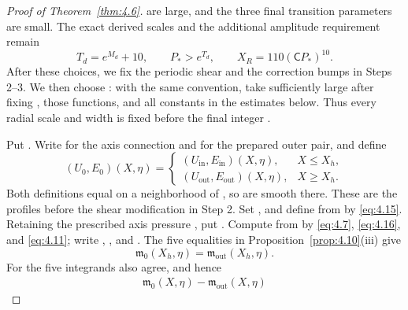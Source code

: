 \begin{proof}[Proof of Theorem~\ref{thm:4.6}]
 are large, and the three final transition
parameters are small. The exact derived scales and the additional amplitude requirement remain
\[
T_d=e^{M_d}+10,\qquad P_*>e^{T_d},\qquad X_R=110(\mathsf C P_*)^{10}.
\]
After these choices, we fix the periodic shear and the correction bumps in Steps 2--3. We then
choose : with the same convention, take
 sufficiently large after fixing
, those functions, and all constants in the estimates
below. Thus every radial scale and width is fixed before the final integer
.

Put . Write
 for the axis connection and
 for the prepared outer pair, and define
\[
(U_0,E_0)(X,\eta)=
\begin{cases}
(U_{\mathrm{in}},E_{\mathrm{in}})(X,\eta),&X\le X_h,\\
(U_{\mathrm{out}},E_{\mathrm{out}})(X,\eta),&X\ge X_h.
\end{cases}
\]
Both definitions equal
 on a neighborhood of
, so  are smooth there. These are the
profiles before the shear modification in Step 2. Set
, and define
 from
 by \eqref{eq:4.15}. Retaining the prescribed axis pressure
, put
. Compute
 from
 by \eqref{eq:4.7}, \eqref{eq:4.16}, and
\eqref{eq:4.11}; write ,
, and
. The five equalities in
Proposition~\ref{prop:4.10}(iii) give
\[
\mathfrak m_0(X_h,\eta)=\mathfrak m_{\mathrm{out}}(X_h,\eta).
\]
For  the five integrands also agree, and hence
\begin{align*}
\mathfrak m_0(X,\eta)-\mathfrak m_{\mathrm{out}}(X,\eta)

\end{align*}
\end{proof}
